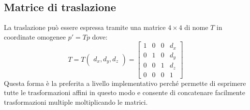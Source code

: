 %
\subsection{Matrice di traslazione}
La traslazione può essere espressa tramite una matrice $ 4 \times 4 $ di nome $ T $ in coordinate omogenee $ p'=Tp $ dove:
\[
    T = T \begin{pmatrix}
        d_{x}, d_{y}, d_{z}
    \end{pmatrix} = \begin{bmatrix}
        1 & 0 & 0 & d_{x} \\
        0 & 1 & 0 & d_{y} \\
        0 & 0 & 1 & d_{z} \\
        0 & 0 & 0 & 1
    \end{bmatrix}
\]
Questa forma è la preferita a livello implementativo perché permette di esprimere tutte le trasformazioni affini in questo modo e consente di concatenare facilmente trasformazioni multiple moltiplicando le matrici.

%
